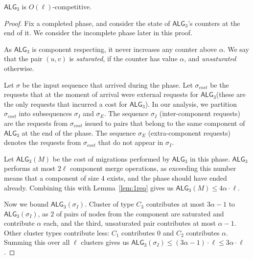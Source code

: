 \documentclass[manuscript,screen=true, review, anonymous]{acmart}
\newcommand{\TAlg}{{\ensuremath{\textsf{ALG}_{3}}}\xspace} %
\begin{document}
\begin{theorem}
  \TAlg is $O(\ell)$-competitive.
\end{theorem}
\begin{proof}
  Fix a completed phase, and consider the state of \TAlg's counters at the end of it.
  We consider the incomplete phase later in this proof.

  As \TAlg is component respecting, it never increases any counter above $\alpha$.
  We say that the pair $(u, v)$ is \emph{saturated}, if the counter has value $\alpha$, and \emph{unsaturated} otherwise.


  Let $\sigma$ be the input sequence that arrived during the phase.
  Let $\sigma_{cost}$ be the requests that at the moment of arrival were external requests for \TAlg (these are the only requests that incurred a cost for \TAlg).
  In our analysis, we partition $\sigma_{cost}$ into subsequences $\sigma_I$ and $\sigma_E$.
  The sequence $\sigma_I$ (inter-component requests) are the requests from $\sigma_{cost}$ issued to pairs that belong to the same component of \TAlg at the end of the phase.
  The sequence $\sigma_E$ (extra-component requests) denotes the requests from $\sigma_{cost}$ that do not appear in $\sigma_I$.


  Let $\TAlg(M)$ be the cost of migrations performed by \TAlg in this phase.
  \TAlg performs at most $2 \ell$ component merge operations, as
  exceeding this number means that a component of size $4$ exists, and the phase should have ended already.
  Combining this with Lemma~\ref{lem:1req} gives us $\TAlg(M) \leq 4\alpha\cdot\ell$.
  
  Now we bound $\TAlg(\sigma_I)$.
  Cluster of type $C_3$ contributes at most $3 \alpha - 1$ to $\TAlg(\sigma_I)$, as $2$ of pairs of nodes from the component are saturated and contribute $\alpha$ each, and the third, unsaturated pair contributes at most $\alpha-1$.
  Other cluster types contribute less: $C_1$ contributes $0$ and $C_2$ contributes $\alpha$.
  Summing this over all $\ell$ clusters gives us $\TAlg(\sigma_I) \leq (3 \alpha-1)\cdot \ell \leq 3\alpha\cdot\ell$.


\end{proof}
\end{document}
